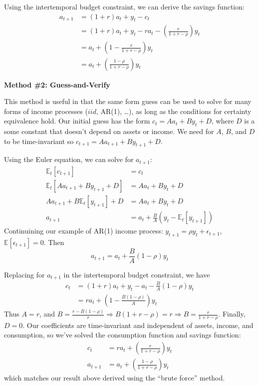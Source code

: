 \documentclass[11pt]{article}
\newcommand{\expectation}{\mathbb{E}}
\begin{document}
Using the intertemporal budget constraint, we can derive the savings function:
\begin{align*}
    a_{t+1} &= (1+r)a_t + y_t - c_t \\
    &= (1+r)a_t + y_t - ra_t - \left(\frac{r}{1+r-\rho}\right)y_t \\
    &= a_t + \left(1 - \frac{r}{1+r-\rho}\right)y_t \\
    &= a_t + \left(\frac{1-\rho}{1+r-\rho}\right) y_t
\end{align*}

\noindent
\textbf{Method \#2: Guess-and-Verify}

This method is useful in that the same form guess can be used to solve for many forms of income processes ($iid$, AR(1), \dots), as long as the conditions for certainty equivalence hold. Our initial guess has the form $c_t = Aa_t + By_t + D$, where $D$ is a some constant that doesn't depend on assets or income. We need for $A$, $B$, and $D$ to be time-invariant so $c_{t+1} = Aa_{t+1} + By_{t+1} + D$.

Using the Euler equation, we can solve for $a_{t+1}$:
\begin{align*}
    \expectation_t[c_{t+1}] &= c_t \\
    \expectation_t[Aa_{t+1} + By_{t+1} + D] &= Aa_t + By_t + D \\
    Aa_{t+1} + B\expectation_t[y_{t+1}] + D &= Aa_t + By_t + D \\
    a_{t+1} &= a_t + \frac{B}{A}\left(y_t - \expectation_t[y_{t+1}] \right)
\end{align*}
Continuining our example of AR(1) income process: $y_{t+1} = \rho y_t + \epsilon_{t+1}$, $\expectation[\epsilon_{t+1}]=0$. Then $$a_{t+1} = a_t + \frac{B}{A}(1-\rho)y_t$$

Replacing for $a_{t+1}$ in the intertemporal budget constraint, we have 
\begin{align*}
    c_t &= (1+r)a_t + y_t - a_t - \frac{B}{A}(1-\rho)y_t \\
        &= r a_t + \left(1 - \frac{B(1-\rho)}{A}\right)y_t
\end{align*}
Thus $A = r$, and $B = \frac{r - B(1-\rho)}{r} \Rightarrow B(1 + r -\rho) = r \Rightarrow B = \frac{r}{1 + r - \rho}$. Finally, $D = 0$. Our coefficients are time-invariant and independent of assets, income, and consumption, so we've solved the consumption function and savings function: 
\begin{align*}
    c_t &= r a_t + \left(\frac{r}{1+r-\rho}\right) y_t \\
    a_{t+1} &= a_t + \left(\frac{1-\rho}{1+r-\rho}\right) y_t
\end{align*}
which matches our result above derived using the ``brute force'' method.
\end{document}
